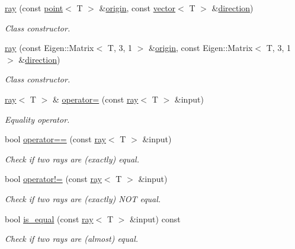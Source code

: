 \begin{DoxyCompactItemize}
\hyperlink{classddd_1_1ray_acac10719a90ebaa930a55f2aff5dd372}{ray} (const \hyperlink{classddd_1_1point}{point}$<$ T $>$ \&\hyperlink{classddd_1_1ray_a92ad567ccc11d6d2bb9faa66cefbb9ca}{origin}, const \hyperlink{classddd_1_1vector}{vector}$<$ T $>$ \&\hyperlink{classddd_1_1ray_a8c6a38d8e1fcda4a44791ad17c99866e}{direction})
\begin{DoxyCompactList}\small\item\em Class constructor. \end{DoxyCompactList}\item 
\hyperlink{classddd_1_1ray_a7dda924f93114bf913684c0241637f7d}{ray} (const Eigen\+::\+Matrix$<$ T, 3, 1 $>$ \&\hyperlink{classddd_1_1ray_a92ad567ccc11d6d2bb9faa66cefbb9ca}{origin}, const Eigen\+::\+Matrix$<$ T, 3, 1 $>$ \&\hyperlink{classddd_1_1ray_a8c6a38d8e1fcda4a44791ad17c99866e}{direction})
\begin{DoxyCompactList}\small\item\em Class constructor. \end{DoxyCompactList}\item 
\hyperlink{classddd_1_1ray}{ray}$<$ T $>$ \& \hyperlink{classddd_1_1ray_a5d035573694570d6a80a76b489ecd9fd}{operator=} (const \hyperlink{classddd_1_1ray}{ray}$<$ T $>$ \&input)
\begin{DoxyCompactList}\small\item\em Equality operator. \end{DoxyCompactList}\item 
bool \hyperlink{classddd_1_1ray_ac2a7a6189983df2aafa917b3a673eb49}{operator==} (const \hyperlink{classddd_1_1ray}{ray}$<$ T $>$ \&input)
\begin{DoxyCompactList}\small\item\em Check if two rays are (exactly) equal. \end{DoxyCompactList}\item 
bool \hyperlink{classddd_1_1ray_a8b119ad8700dddcff3fcdc45673456a4}{operator!=} (const \hyperlink{classddd_1_1ray}{ray}$<$ T $>$ \&input)
\begin{DoxyCompactList}\small\item\em Check if two rays are (exactly) N\+OT equal. \end{DoxyCompactList}\item 
bool \hyperlink{classddd_1_1ray_a9f556671f1aafce7838d9cd716e1bd72}{is\+\_\+equal} (const \hyperlink{classddd_1_1ray}{ray}$<$ T $>$ \&input) const
\begin{DoxyCompactList}\small\item\em Check if two rays are (almost) equal. \end{DoxyCompactList}\item 

\end{DoxyCompactItemize}

